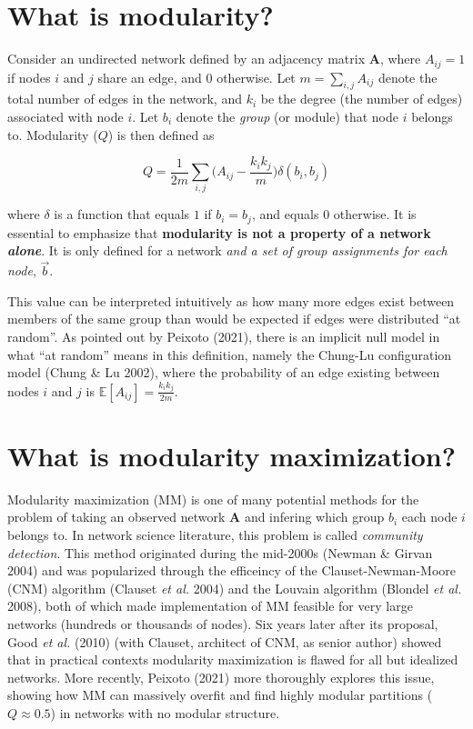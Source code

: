 \documentclass[
]{article}
\begin{document}
\hypertarget{what-is-modularity}{%
\section{What is modularity?}\label{what-is-modularity}}

Consider an undirected network defined by an adjacency matrix
\(\mathbf{A}\), where \(A_{ij} = 1\) if nodes \(i\) and \(j\) share an
edge, and \(0\) otherwise. Let \(m = \sum_{i,j} A_{ij}\) denote the
total number of edges in the network, and \(k_i\) be the degree (the
number of edges) associated with node \(i\). Let \(b_i\) denote the
\emph{group} (or module) that node \(i\) belongs to. Modularity (\(Q\))
is then defined as

\[Q = \frac{1}{2m} \sum_{i,j} \bigg( A_{ij} - \frac{k_i k_j}{m}\bigg)
\delta(b_i, b_j)\]

where \(\delta\) is a function that equals \(1\) if \(b_i = b_j\), and
equals \(0\) otherwise. It is essential to emphasize that
\textbf{modularity is not a property of a network \emph{alone}}. It is
only defined for a network \emph{and a set of group assignments for each
node}, \(\vec{b}\).

This value can be interpreted intuitively as how many more edges exist
between members of the same group than would be expected if edges were
distributed ``at random''. As pointed out by Peixoto (2021), there is an
implicit null model in what ``at random'' means in this definition,
namely the Chung-Lu configuration model (Chung \& Lu 2002), where the
probability of an edge existing between nodes \(i\) and \(j\) is
\(\mathbb{E}[A_{ij}] = \frac{k_i k_j}{2m}\).

\hypertarget{what-is-modularity-maximization}{%
\section{What is modularity
maximization?}\label{what-is-modularity-maximization}}

Modularity maximization (MM) is one of many potential methods for the
problem of taking an observed network \(\mathbf{A}\) and infering which
group \(b_i\) each node \(i\) belongs to. In network science literature,
this problem is called \emph{community detection}. This method
originated during the mid-2000s (Newman \& Girvan 2004) and was
popularized through the efficeincy of the Clauset-Newman-Moore (CNM)
algorithm (Clauset \emph{et al.} 2004) and the Louvain algorithm
(Blondel \emph{et al.} 2008), both of which made implementation of MM
feasible for very large networks (hundreds or thousands of nodes). Six
years later after its proposal, Good \emph{et al.} (2010) (with Clauset,
architect of CNM, as senior author) showed that in practical contexts
modularity maximization is flawed for all but idealized networks. More
recently, Peixoto (2021) more thoroughly explores this issue, showing
how MM can massively overfit and find highly modular partitions
(\(Q \approx 0.5\)) in networks with no modular structure.
\end{document}
